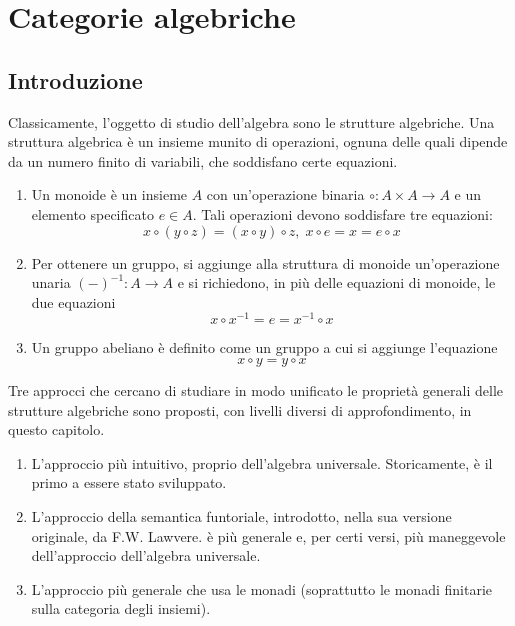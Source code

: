 \chapter{Categorie algebriche}\label{cap_cat_alg}

\section{Introduzione}\label{sec_intro}

Classicamente, l'oggetto di studio dell'algebra sono le strutture algebriche. Una struttura algebrica è un insieme munito di operazioni,
ognuna delle quali dipende da un numero finito di variabili, che soddisfano certe equazioni.

\begin{examples}\label{esempi_strutture_alg}
 \hfill
 \begin{enumerate}
  \item Un monoide è un insieme \(A\) con un'operazione binaria \(\circ \colon A \times A \to A\) e un elemento specificato \(e \in A\). Tali
        operazioni devono soddisfare tre equazioni:
        \[x \circ (y \circ z) = (x \circ y) \circ z, \; x \circ e = x = e \circ x\]
  \item Per ottenere un gruppo, si aggiunge alla struttura di monoide un'operazione unaria \((-)^{-1} \colon A \to A\) e si richiedono, in più
        delle equazioni di monoide, le due equazioni
        \[x \circ x^{-1} = e = x^{-1} \circ x\]
  \item Un gruppo abeliano è definito come un gruppo a cui si aggiunge l'equazione
        \[x \circ y = y \circ x\]
 \end{enumerate}
\end{examples}

Tre approcci che cercano di studiare in modo unificato le proprietà generali delle strutture algebriche sono proposti, con livelli diversi di
approfondimento, in questo capitolo.
\begin{enumerate}
 \item L'approccio più intuitivo, proprio dell'algebra universale. Storicamente, è il primo a essere stato sviluppato.
 \item L'approccio della semantica funtoriale, introdotto, nella sua versione originale, da F.W. Lawvere. è più generale e, per certi versi, più
       maneggevole dell'approccio dell'algebra universale.
 \item L'approccio più generale che usa le monadi (soprattutto le monadi finitarie sulla categoria degli insiemi).
\end{enumerate}

